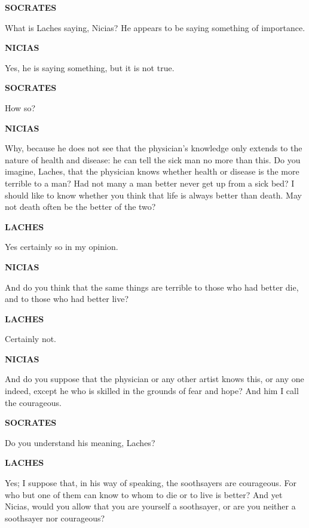 \documentclass[11pt,letter]{book}
\begin{document}
\par \textbf{SOCRATES}
\par   What is Laches saying, Nicias? He appears to be saying something of importance.

\par \textbf{NICIAS}
\par   Yes, he is saying something, but it is not true.

\par \textbf{SOCRATES}
\par   How so?

\par \textbf{NICIAS}
\par   Why, because he does not see that the physician's knowledge only extends to the nature of health and disease:  he can tell the sick man no more than this. Do you imagine, Laches, that the physician knows whether health or disease is the more terrible to a man? Had not many a man better never get up from a sick bed? I should like to know whether you think that life is always better than death. May not death often be the better of the two?

\par \textbf{LACHES}
\par   Yes certainly so in my opinion.

\par \textbf{NICIAS}
\par   And do you think that the same things are terrible to those who had better die, and to those who had better live?

\par \textbf{LACHES}
\par   Certainly not.

\par \textbf{NICIAS}
\par   And do you suppose that the physician or any other artist knows this, or any one indeed, except he who is skilled in the grounds of fear and hope? And him I call the courageous.

\par \textbf{SOCRATES}
\par   Do you understand his meaning, Laches?

\par \textbf{LACHES}
\par   Yes; I suppose that, in his way of speaking, the soothsayers are courageous. For who but one of them can know to whom to die or to live is better? And yet Nicias, would you allow that you are yourself a soothsayer, or are you neither a soothsayer nor courageous?
\end{document}
